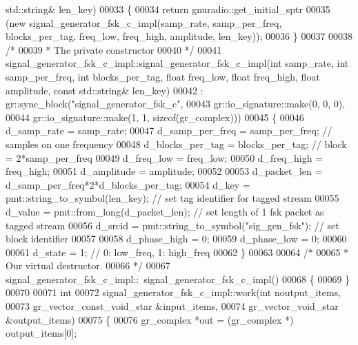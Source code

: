 \begin{DoxyCode}
      std::string& len\_key)
00033     \{
00034       \textcolor{keywordflow}{return} gnuradio::get\_initial\_sptr
00035         (\textcolor{keyword}{new} signal_generator_fsk_c_impl(samp\_rate, samp\_per\_freq, blocks\_per\_tag, freq\_low, freq\_high, 
      amplitude, len\_key));
00036     \}
00037 
00038     \textcolor{comment}{/*}
00039 \textcolor{comment}{     * The private constructor}
00040 \textcolor{comment}{     */}
00041     signal_generator_fsk_c_impl::signal_generator_fsk_c_impl(\textcolor{keywordtype}{int} samp_rate, \textcolor{keywordtype}{int} 
      samp_per_freq, \textcolor{keywordtype}{int} blocks_per_tag, \textcolor{keywordtype}{float} freq\_low, \textcolor{keywordtype}{float} freq\_high, \textcolor{keywordtype}{float} amplitude, \textcolor{keyword}{const} 
      std::string& len\_key)
00042       : gr::sync\_block(\textcolor{stringliteral}{"signal\_generator\_fsk\_c"},
00043               gr::io\_signature::make(0, 0, 0),
00044               gr::io\_signature::make(1, 1, sizeof(gr\_complex)))
00045     \{
00046         d_samp_rate = samp_rate;
00047         d_samp_per_freq = samp_per_freq; \textcolor{comment}{// samples on one frequency}
00048         d_blocks_per_tag = blocks_per_tag; \textcolor{comment}{// block = 2*samp\_per\_freq}
00049         d_freq_low = freq\_low;
00050         d_freq_high = freq\_high;
00051         d_amplitude = amplitude;
00052         
00053         d_packet_len = d_samp_per_freq*2*d_blocks_per_tag;
00054         d_key = pmt::string\_to\_symbol(len\_key); \textcolor{comment}{// set tag identifier for tagged stream}
00055         d_value = pmt::from\_long(d_packet_len); \textcolor{comment}{// set length of 1 fsk packet as tagged stream}
00056         d_srcid = pmt::string\_to\_symbol(\textcolor{stringliteral}{"sig\_gen\_fsk"}); \textcolor{comment}{// set block identifier}
00057         
00058         d_phase_high = 0;
00059         d_phase_low = 0;
00060         
00061         d_state = 1; \textcolor{comment}{// 0: low\_freq, 1: high\_freq}
00062     \}
00063 
00064     \textcolor{comment}{/*}
00065 \textcolor{comment}{     * Our virtual destructor.}
00066 \textcolor{comment}{     */}
00067     signal_generator_fsk_c_impl::~signal_generator_fsk_c_impl()
00068     \{
00069     \}
00070 
00071     \textcolor{keywordtype}{int}
00072     signal_generator_fsk_c_impl::work(\textcolor{keywordtype}{int} noutput\_items,
00073               gr\_vector\_const\_void\_star &input\_items,
00074               gr\_vector\_void\_star &output\_items)
00075     \{
00076         gr\_complex *out = (gr\_complex *) output\_items[0];

\end{DoxyCode}
